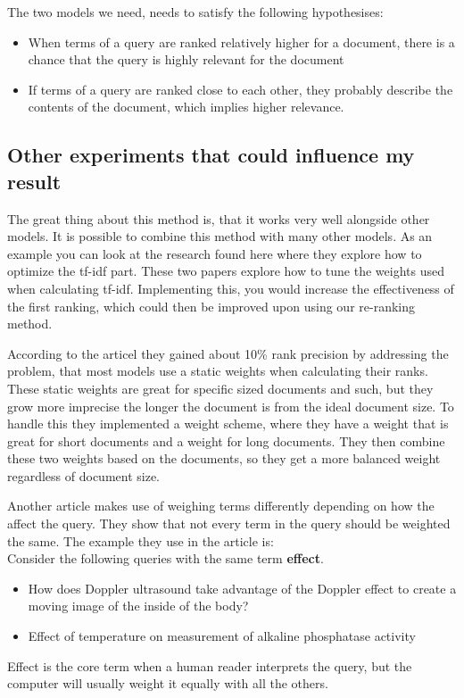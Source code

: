 \documentclass{sig-alternate}
\begin{document}
The two models we need, needs to satisfy the following hypothesises:
\begin{itemize}
\item When terms of a query are ranked relatively higher for a document, there is a chance that the query is highly relevant for the document
\item If terms of a query are ranked close to each other, they probably describe the contents of the document, which implies higher relevance.
\end{itemize}
\subsection{Other experiments that could influence my result}

The great thing about this method is, that it works very well alongside other models. It is possible to combine this method with many other models. As an example you can look at the research found here\cite{review1} where they explore how to optimize the tf-idf part. These two papers explore how to tune the weights used when calculating tf-idf. Implementing this, you would increase the effectiveness of the first ranking, which could then be improved upon using our re-ranking method. 

According to the articel\cite{review1} they gained about 10\% rank precision by addressing the problem, that most models use a static weights when calculating their ranks. These static weights are great for specific sized documents and such, but they grow more imprecise the longer the document is from the ideal document size. To handle this they implemented a weight scheme, where they have a weight that is great for short documents and a weight for long documents. They then combine these two weights based on the documents, so they get a more balanced weight regardless of document size.

Another article\cite{review3} makes use of weighing terms differently depending on how the affect the query. They show that not every term in the query should be weighted the same. The example they use in the article is:\\
Consider the following queries with the same term \textbf{effect}.
\begin{itemize}
\item How does Doppler ultrasound take advantage of the
Doppler effect to create a moving image of the inside
of the body?
\item Effect of temperature on measurement of alkaline phosphatase
activity
\end{itemize}
Effect is the core term when a human reader interprets the query, but the computer will usually weight it equally with all the others. 
\end{document}
